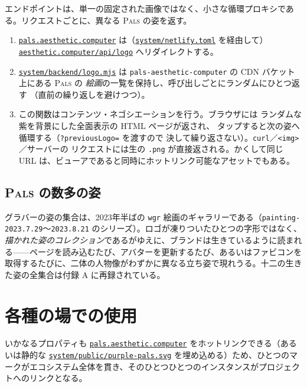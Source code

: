 \documentclass[10pt,letterpaper,twocolumn]{article}
\newcommand{\pals}{\textsc{Pals}}
\newcommand{\repofile}[1]{\href{https://github.com/whistlegraph/aesthetic-computer/blob/main/#1}{\texttt{#1}}}
\begin{document}
エンドポイントは、単一の固定された画像ではなく、小さな循環プロキシである。リクエストごとに、異なる \pals{} の姿を返す。

\begin{enumerate}
  \item \href{https://pals.aesthetic.computer}{\texttt{pals.aesthetic.computer}}
        は（\repofile{system/netlify.toml} を経由して）
        \href{https://aesthetic.computer/api/logo}{\texttt{aesthetic.computer/api/logo}}
        へリダイレクトする。
  \item \repofile{system/backend/logo.mjs} は
        \texttt{pals-aesthetic-computer} の CDN バケット上にある \pals{} の
        \emph{絵画}の一覧を保持し、呼び出しごとにランダムにひとつ返す
        （直前の繰り返しを避けつつ）。
  \item この関数はコンテンツ・ネゴシエーションを行う。ブラウザには
        ランダムな紫を背景にした全面表示の HTML ページが返され、
        タップすると次の姿へ循環する（\texttt{?previousLogo=} を渡すので
        決して繰り返さない）。\texttt{curl}／\texttt{<img>}／サーバーの
        リクエストには生の \texttt{.png} が直接返される。かくして同じ URL
        は、ビューアであると同時にホットリンク可能なアセットでもある。
\end{enumerate}

\subsection{\pals{} の数多の姿}

グラバーの姿の集合は、2023年半ばの \texttt{wgr} 絵画のギャラリーである（\texttt{painting-2023.7.29}〜\texttt{2023.8.21} のシリーズ）。ロゴが凍りついたひとつの字形ではなく、\emph{描かれた姿のコレクション}であるがゆえに、ブランドは生きているように読まれる——ページを読み込むたび、アバターを更新するたび、あるいはファビコンを取得するたびに、二体の人物像がわずかに異なる立ち姿で現れうる。十二の生きた姿の全集合は付録 A に再録されている。

\section{各種の場での使用}

いかなるプロパティも \href{https://pals.aesthetic.computer}{\texttt{pals.aesthetic.computer}} をホットリンクできる（あるいは静的な \repofile{system/public/purple-pals.svg} を埋め込める）ため、ひとつのマークがエコシステム全体を貫き、そのひとつひとつのインスタンスがプロジェクトへのリンクとなる。
\end{document}
